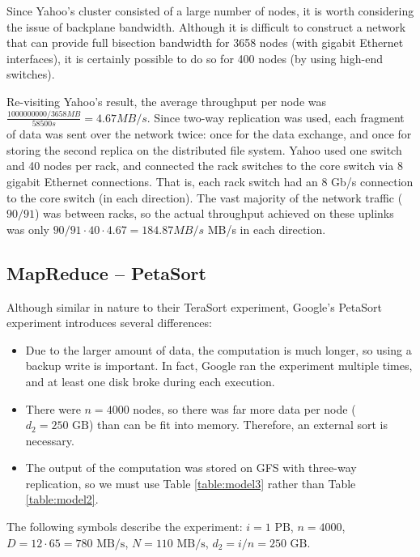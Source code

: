 \documentclass{acm_proc_article-sp}
\begin{document}
Since Yahoo's cluster consisted of a large number of nodes, it is worth
considering the issue of backplane bandwidth. Although it is difficult
to construct a network that can provide full bisection bandwidth for 3658 nodes
(with gigabit Ethernet interfaces), it is certainly possible to do so for 400
nodes (by using high-end switches).

Re-visiting Yahoo's result, the average throughput per node was
$\frac{1000000000/3658 MB}{58500 s} = 4.67 MB/s$. Since two-way replication was
used, each fragment of data was sent over the network twice: once for
the data exchange, and once for storing the second replica on the distributed file
system. Yahoo used one switch and 40 nodes per rack, and connected the rack
switches to the core switch via 8 gigabit Ethernet connections. That is, each
rack switch had an 8 Gb/s connection to the core switch (in each direction). The
vast majority of the network traffic ($90/91$) was between racks, so the actual
throughput achieved on these uplinks was only $90/91 \cdot 40 \cdot 4.67 =
184.87 MB/s$ MB/s in each direction.

\subsection{MapReduce -- PetaSort}

Although similar in nature to their TeraSort experiment, Google's PetaSort
experiment introduces several differences:
\begin{itemize}
  \item Due to the larger amount of data, the computation is much longer, so
  using a backup write is important. In fact, Google ran the experiment
  multiple times, and at least one disk broke during each execution.
  \item There were $n = 4000$ nodes, so there was far more data per node ($d_2
  = 250 \text{ GB}$) than can be fit into memory. Therefore, an external sort
  is necessary.
  \item The output of the computation was stored on GFS with three-way
  replication, so we must use Table \ref{table:model3} rather than Table
  \ref{table:model2}.
\end{itemize}

The following symbols describe
the experiment: $i = 1 \text{ PB}$, $n = 4000$, $D = 12 \cdot 65 = 780 \text{ MB/s}$, $N = 110
\text{ MB/s}$, $d_2 = i/n = 250 \text{ GB}$. 
\end{document}
